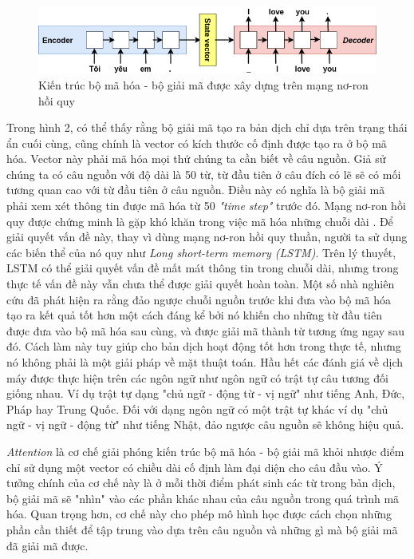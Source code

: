 \begin{figure}
	\centering
	\includegraphics[width=\textwidth]{encoder-decoder}
	\caption[Kiến trúc bộ mã hóa - bộ giải mã được xây dựng trên mạng nơ-ron hồi quy]{Kiến trúc bộ mã hóa - bộ giải mã được xây dựng trên mạng nơ-ron hồi quy}
	\label{fig_intronmt}
\end{figure}

Trong hình 2, có thể thấy rằng bộ giải mã tạo ra bản dịch chỉ dựa trên trạng thái ẩn cuối cùng, cũng chính là vector có kích thước cố định được tạo ra ở bộ mã hóa. Vector này phải mã hóa mọi thứ chúng ta cần biết về câu nguồn. Giả sử chúng ta có câu nguồn với độ dài là 50 từ, từ đầu tiên ở câu đích có lẽ sẽ có mối tương quan cao với từ đầu tiên ở câu nguồn. Điều này có nghĩa là bộ giải mã phải xem xét thông tin được mã hóa từ 50 \textit{"time step"} trước đó. Mạng nơ-ron hồi quy được chứng minh là gặp khó khăn trong việc mã hóa những chuỗi dài \cite{difficultyRNN}. Để giải quyết vấn đề này, thay vì dùng mạng nơ-ron hồi quy thuần, người ta sử dụng các biến thể của nó quy như \textit{Long short-term memory (LSTM)}. Trên lý thuyết, LSTM có thể giải quyết vấn đề mất mát thông tin trong chuỗi dài, nhưng trong thực tế vấn đề này vẫn chưa thể được giải quyết hoàn toàn. Một số nhà nghiên cứu đã phát hiện ra rằng đảo ngược chuỗi nguồn trước khi đưa vào bộ mã hóa tạo ra kết quả tốt hơn một cách đáng kể \cite{significantBetterResultNMT} bởi nó khiến cho những từ đầu tiên được đưa vào bộ mã hóa sau cùng, và được giải mã thành từ tương ứng ngay sau đó. Cách làm này tuy giúp cho bản dịch hoạt động tốt hơn trong thực tế, nhưng nó không phải là một giải pháp về mặt thuật toán. Hầu hết các đánh giá về dịch máy được thực hiện trên các ngôn ngữ như ngôn ngữ có trật tự câu tương đối giống nhau. Ví dụ trật tự dạng "chủ ngữ - động từ - vị ngữ" như tiếng Anh, Đức, Pháp hay Trung Quốc. Đối với dạng ngôn ngữ có một trật tự khác ví dụ "chủ ngữ - vị ngữ - động từ" như tiếng Nhật, đảo ngược câu nguồn sẽ không hiệu quả.

\textit{Attention} là cơ chế giải phóng kiến trúc bộ mã hóa - bộ giải mã khỏi nhược điểm chỉ sử dụng một vector có chiều dài cố định làm đại diện cho câu đầu vào. Ý tưởng chính của cơ chế này là ở mỗi thời điểm phát sinh các từ trong bản dịch, bộ giải mã sẽ "nhìn" vào các phần khác nhau của câu nguồn trong quá trình mã hóa. Quan trọng hơn, cơ chế này cho phép mô hình học được cách chọn những phần cần thiết để tập trung vào dựa trên câu nguồn và những gì mà bộ giải mã đã giải mã được.

